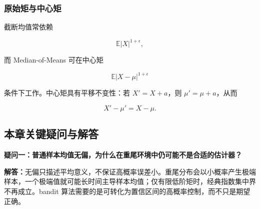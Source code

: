 \documentclass[
  11pt,
  a4paper,
]{ctexart}
\providecommand{\tightlist}{%
  \setlength{\itemsep}{0pt}\setlength{\parskip}{0pt}}
\begin{document}
\subsubsection{原始矩与中心矩}\label{ux539fux59cbux77e9ux4e0eux4e2dux5fc3ux77e9}

截断均值常依赖

\[
\mathbb E|X|^{1+\epsilon},
\]

而 Median-of-Means 可在中心矩

\[
\mathbb E|X-\mu|^{1+\epsilon}
\]

条件下工作。中心矩具有平移不变性：若 \(X'=X+a\)，则 \(\mu'=\mu+a\)，从而

\[
X'-\mu'=X-\mu.
\]

\subsection{本章关键疑问与解答}\label{ux672cux7ae0ux5173ux952eux7591ux95ee-5}

\textbf{疑问一：普通样本均值无偏，为什么在重尾环境中仍可能不是合适的估计器？}

\textbf{解答：}无偏只描述平均意义，不保证高概率误差小。重尾分布会以小概率产生极端样本，一个极端值就可能长时间主导样本均值；仅有限低阶矩时，经典指数集中界不再成立。bandit 算法需要的是可转化为置信区间的高概率控制，而不只是期望正确。
\end{document}
